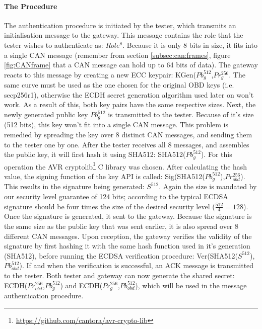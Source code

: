\paragraph{The Procedure}

The authentication procedure is initiated by the tester, which transmits an initialisation message to the gateway. This message contains the role that the tester wishes to authenticate as: $Role^8$. Because it is only 8 bits in size, it fits into a single CAN message (remember from section \ref{subsec:can:frames}, figure \ref{fig:CANframe} that a CAN message can hold up to 64 bits of data). The gateway reacts to this message by creating a new ECC keypair: KGen($Pb_g^{512}$,$Pr_g^{256}$. The same curve must be used as the one chosen for the original OBD keys (i.e. secp256r1), otherwise the ECDH secret generation algorithm used later on won't work. As a result of this, both key pairs have the same respective sizes. Next, the newly generated public key $Pb_g^{512}$ is transmitted to the tester. Because of it's size (512 bits), this key won't fit into a single CAN message. This problem is remedied by spreading the key over 8 distinct CAN messages, and sending them to the tester one by one. After the tester receives all 8 messages, and assembles the public key, it will first hash it using SHA512: SHA512($Pb_g^{512}$). For this operation the AVR cryptolib\footnote{\url{https://github.com/cantora/avr-crypto-lib}} C library was chosen. After calculating the hash value, the signing function of the key API is called: Sig(SHA512($Pb_g^{512}$),$Pr_{obd}^{256}$). This results in the signature being generated: $S^{512}$. Again the size is mandated by our security level guarantee of 124 bits; according to \cite{wiki:ECDSA} the typical ECDSA signature should be four times the size of the desired security level ($\frac{512}{4}=128$). Once the signature is generated, it sent to the gateway. Because the signature is the same size as the public key that was sent earlier, it is also spread over 8 different CAN messages. Upon reception, the gateway verifies the validity of the signature by first hashing it with the same hash function used in it's generation (SHA512), before running the ECDSA verification procedure: Ver(SHA512($S^{512}$),$Pb_{obd}^{512}$). If and when the verification is successful, an ACK message is transmitted to the tester. Both tester and gateway can now generate the shared secret: ECDH($Pr_{obd}^{256}$,$Pb_g^{512}$) and ECDH($Pr_g^{256}$,$Pb_{obd}^{512}$), which will be used in the message authentication procedure.


